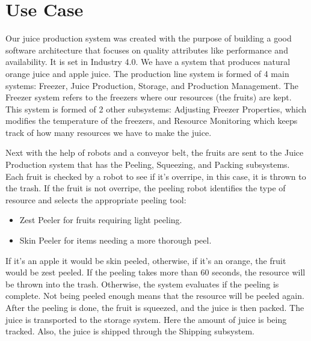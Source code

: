 \documentclass[conference]{IEEEtran}
\begin{document}
\section{Use Case}




Our juice production system was created with the purpose of building a good software architecture that focuses on quality attributes like performance and availability. It is set in Industry 4.0. We have a system that produces natural orange juice and apple juice. The production line system is formed of 4 main systems: Freezer, Juice Production, Storage, and Production Management. The Freezer system refers to the freezers where our resources (the fruits) are kept. 
This system is formed of 2 other subsystems: Adjusting Freezer Properties, which modifies the temperature of the freezers, and Resource Monitoring which keeps track of how many resources we have to make the juice. 

Next with the help of robots and a conveyor belt, the fruits are sent to the Juice Production system that has the Peeling, Squeezing, and Packing subsystems. Each fruit is checked by a robot to see if it’s overripe, in this case, it is thrown to the trash. If the fruit is not overripe, the peeling robot identifies the type of resource and selects the appropriate peeling tool:\begin{itemize}
    \item Zest Peeler for fruits requiring light peeling.
    \item Skin Peeler for items needing a more thorough peel.
\end{itemize}
 If it’s an apple it would be skin peeled, otherwise, if it’s an orange, the fruit would be zest peeled. If the peeling takes more than 60 seconds, the resource will be thrown into the trash. Otherwise, the system evaluates if the peeling is complete. Not being peeled enough means that the resource will be peeled again. After the peeling is done, the fruit is squeezed, and the juice is then packed. The juice is transported to the storage system. Here the amount of juice is being tracked. Also, the juice is shipped through the Shipping subsystem. 
 
\end{document}
